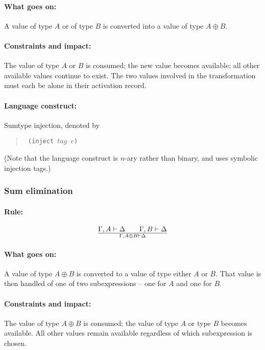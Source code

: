 \documentclass[a4paper]{article}
\begin{document}
\paragraph{What goes on:} A value of type $A$ or of type $B$ is
converted into a value of type $A \oplus B$.

\paragraph{Constraints and impact:} The value of type $A$ or $B$ is
consumed; the new value becomes available; all other available values
continue to exist.
The two values involved in the transformation must each be alone in
their activation record.

\paragraph{Language construct:} Sumtype injection, denoted by
\begin{quote}\tt
  (inject $\mathit{tag}$ $e$)
\end{quote}
(Note that the language construct is $n$-ary rather than binary, and
uses symbolic injection tags.)


\subsubsection{Sum elimination}
\paragraph{Rule:}
$$
{
  \Gamma,A \vdash \Delta \qquad \Gamma,B \vdash \Delta
}\over{
  \Gamma, A\oplus B \vdash \Delta
}
$$

\paragraph{What goes on:} A value of type $A \oplus B$ is converted to
a value of type either $A$ or $B$. That value is then handled of one
of two subexpressions -- one for $A$ and one for $B$.

\paragraph{Constraints and impact:} The value of type $A \oplus B$ is
consumed; the value of type $A$ or type $B$ becomes available.
All other values remain available regardless of which subexpression is chosen.
\end{document}
